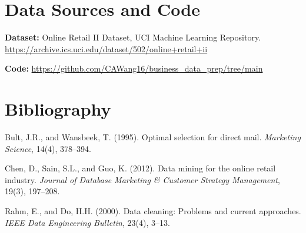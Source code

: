 \documentclass[10pt,a4paper]{article}
\begin{document}
\section{Data Sources and Code}

\footnotesize
\textbf{Dataset:} Online Retail II Dataset, UCI Machine Learning Repository. 
\url{https://archive.ics.uci.edu/dataset/502/online+retail+ii}

\textbf{Code:} \url{https://github.com/CAWang16/business_data_prep/tree/main}

\section{Bibliography}

\footnotesize
Bult, J.R., and Wansbeek, T. (1995). Optimal selection for direct mail. \textit{Marketing Science}, 14(4), 378--394.

Chen, D., Sain, S.L., and Guo, K. (2012). Data mining for the online retail industry. \textit{Journal of Database Marketing \& Customer Strategy Management}, 19(3), 197--208.

Rahm, E., and Do, H.H. (2000). Data cleaning: Problems and current approaches. \textit{IEEE Data Engineering Bulletin}, 23(4), 3--13.
\end{document}
